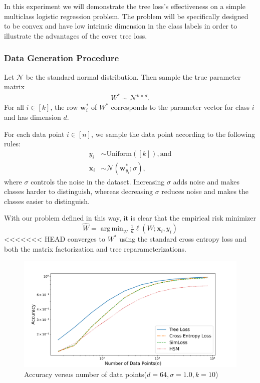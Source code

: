\documentclass[twoside]{article}
\DeclareMathOperator*{\argmin}{arg\,min}
\renewcommand{\star}[1]{{#1}^{*}}
\newcommand{\w}{\mathbf w}
\newcommand{\x}{\mathbf x}
\newcommand{\fixme}[1]{}
\begin{document}
In this experiment we will demonstrate the tree loss's effectiveness on a simple multiclass logistic regression problem.
The problem will be specifically designed to be convex and have low intrinsic dimension in the class labels in order to illustrate the advantages of the cover tree loss.

\subsubsection{Data Generation Procedure}
\label{sec:exp:synth:problem}

Let $\mathcal N$ be the standard normal distribution.
Then sample the true parameter matrix
\begin{align}
    \star W \sim \mathcal N^{k\times d}
    .
\end{align}
For all $i \in [k]$, the row $\w_i^*$ of $W^*$ corresponds to the parameter vector for class $i$ and has dimension $d$.

For each data point $i\in[n]$,
we sample the data point according to the following rules:
\begin{align}
    y_i &\sim \text{Uniform}([k]), \text{and} \\
    \x_{i} &\sim \mathcal N(\w^*_{y_i}; \sigma),
\end{align}
where $\sigma$ controls the noise in the dataset.
Increasing $\sigma$ adds noise and makes classes harder to distinguish,
whereas decreasing $\sigma$ reduces noise and makes the classes easier to distinguish.

With our problem defined in this way, it is clear that the empirical risk minimizer
\begin{equation}
    \hat W = \argmin_{W} \tfrac 1 n \ell(W; \x_i, y_i)
\end{equation}
<<<<<<< HEAD
converges to $W^*$ using the standard cross entropy loss and both the matrix factorization and tree reparameterizations.

\begin{figure}[h]
\vspace{.3in}
\includegraphics[width=\linewidth]{fig/images/accuracy_vs_n.png}
\vspace{.3in}
\caption{\small Accuracy versus number of data points($d=64, \sigma=1.0, k=10$)}
\label{accuracy_vs_n}
\end{figure}
\end{document}
